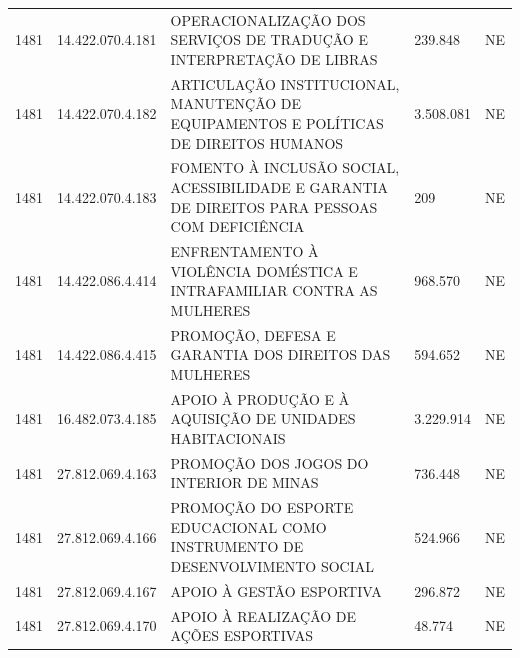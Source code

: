 \documentclass{article}
\begin{document}
\begin{longtable}[c]{m{1cm}|m{2cm}|m{10cm}|m{2cm}|m{1cm}}
\multicolumn{1}{C{1cm}|}{1481} & \multicolumn{1}{C{2cm}|}{14.422.070.4.181} & \multicolumn{1}{L{10cm}|}{OPERACIONALIZAÇÃO DOS SERVIÇOS DE TRADUÇÃO E INTERPRETAÇÃO DE LIBRAS} & \multicolumn{1}{R{2cm}|}{239.848} & \multicolumn{1}{C{1cm}}{NE} \\
\multicolumn{1}{C{1cm}|}{1481} & \multicolumn{1}{C{2cm}|}{14.422.070.4.182} & \multicolumn{1}{L{10cm}|}{ARTICULAÇÃO INSTITUCIONAL, MANUTENÇÃO DE EQUIPAMENTOS E POLÍTICAS DE DIREITOS HUMANOS} & \multicolumn{1}{R{2cm}|}{3.508.081} & \multicolumn{1}{C{1cm}}{NE} \\
\multicolumn{1}{C{1cm}|}{1481} & \multicolumn{1}{C{2cm}|}{14.422.070.4.183} & \multicolumn{1}{L{10cm}|}{FOMENTO À INCLUSÃO SOCIAL, ACESSIBILIDADE E GARANTIA DE DIREITOS PARA PESSOAS COM DEFICIÊNCIA} & \multicolumn{1}{R{2cm}|}{209} & \multicolumn{1}{C{1cm}}{NE} \\
\multicolumn{1}{C{1cm}|}{1481} & \multicolumn{1}{C{2cm}|}{14.422.086.4.414} & \multicolumn{1}{L{10cm}|}{ENFRENTAMENTO À VIOLÊNCIA DOMÉSTICA E INTRAFAMILIAR CONTRA AS MULHERES} & \multicolumn{1}{R{2cm}|}{968.570} & \multicolumn{1}{C{1cm}}{NE} \\
\multicolumn{1}{C{1cm}|}{1481} & \multicolumn{1}{C{2cm}|}{14.422.086.4.415} & \multicolumn{1}{L{10cm}|}{PROMOÇÃO, DEFESA E GARANTIA DOS DIREITOS DAS MULHERES} & \multicolumn{1}{R{2cm}|}{594.652} & \multicolumn{1}{C{1cm}}{NE} \\
\multicolumn{1}{C{1cm}|}{1481} & \multicolumn{1}{C{2cm}|}{16.482.073.4.185} & \multicolumn{1}{L{10cm}|}{APOIO À PRODUÇÃO E À AQUISIÇÃO DE UNIDADES HABITACIONAIS} & \multicolumn{1}{R{2cm}|}{3.229.914} & \multicolumn{1}{C{1cm}}{NE} \\
\multicolumn{1}{C{1cm}|}{1481} & \multicolumn{1}{C{2cm}|}{27.812.069.4.163} & \multicolumn{1}{L{10cm}|}{PROMOÇÃO DOS JOGOS DO INTERIOR DE MINAS} & \multicolumn{1}{R{2cm}|}{736.448} & \multicolumn{1}{C{1cm}}{NE} \\
\multicolumn{1}{C{1cm}|}{1481} & \multicolumn{1}{C{2cm}|}{27.812.069.4.166} & \multicolumn{1}{L{10cm}|}{PROMOÇÃO DO ESPORTE EDUCACIONAL COMO INSTRUMENTO DE DESENVOLVIMENTO SOCIAL} & \multicolumn{1}{R{2cm}|}{524.966} & \multicolumn{1}{C{1cm}}{NE} \\
\multicolumn{1}{C{1cm}|}{1481} & \multicolumn{1}{C{2cm}|}{27.812.069.4.167} & \multicolumn{1}{L{10cm}|}{APOIO À GESTÃO ESPORTIVA} & \multicolumn{1}{R{2cm}|}{296.872} & \multicolumn{1}{C{1cm}}{NE} \\
\multicolumn{1}{C{1cm}|}{1481} & \multicolumn{1}{C{2cm}|}{27.812.069.4.170} & \multicolumn{1}{L{10cm}|}{APOIO À REALIZAÇÃO DE AÇÕES ESPORTIVAS} & \multicolumn{1}{R{2cm}|}{48.774} & \multicolumn{1}{C{1cm}}{NE} \\

\end{longtable}
\end{document}
